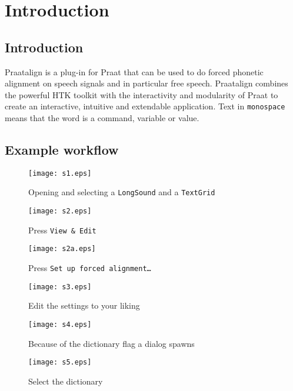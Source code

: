 
\cleardoublepage
\maketitle
\setcounter{page}{1}
\tableofcontents
\chapter{Introduction}
\section{Introduction}
Praatalign is a plug-in for Praat that can be used to do forced phonetic
alignment on speech signals and in particular free speech. Praatalign combines
the powerful HTK toolkit with the interactivity and modularity of Praat to
create an interactive, intuitive and extendable application. Text in
\texttt{monospace} means that the word is a command, variable or value.

\section{Example workflow}
\begin{figure}[H]
	\centering
	\texttt{[image: s1.eps]}
	\caption{Opening and selecting a \texttt{LongSound} and a \texttt{TextGrid}}
\end{figure}

\begin{figure}[H]
	\centering
	\texttt{[image: s2.eps]}
	\caption{Press \texttt{View \& Edit}}
\end{figure}

\begin{figure}[H]
	\centering
	\texttt{[image: s2a.eps]}
	\caption{Press \texttt{Set up forced alignment\ldots}}
\end{figure}

\begin{figure}[H]
	\centering
	\texttt{[image: s3.eps]}
	\caption{Edit the settings to your liking}
\end{figure}

\begin{figure}[H]
	\centering
	\texttt{[image: s4.eps]}
	\caption{Because of the dictionary flag a dialog spawns}
\end{figure}

\begin{figure}[H]
	\centering
	\texttt{[image: s5.eps]}
	\caption{Select the dictionary}
\end{figure}

